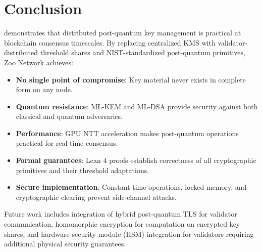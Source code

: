 \section{Conclusion}


\KChain{} demonstrates that distributed post-quantum key management is practical at blockchain consensus timescales. By replacing centralized KMS with validator-distributed threshold shares and NIST-standardized post-quantum primitives, Zoo Network achieves:

\begin{itemize}
\item \textbf{No single point of compromise}: Key material never exists in complete form on any node.
\item \textbf{Quantum resistance}: ML-KEM and ML-DSA provide security against both classical and quantum adversaries.
\item \textbf{Performance}: GPU NTT acceleration makes post-quantum operations practical for real-time consensus.
\item \textbf{Formal guarantees}: Lean 4 proofs establish correctness of all cryptographic primitives and their threshold adaptations.
\item \textbf{Secure implementation}: Constant-time operations, locked memory, and cryptographic clearing prevent side-channel attacks.
\end{itemize}

Future work includes integration of hybrid post-quantum TLS for validator communication, homomorphic encryption for computation on encrypted key shares, and hardware security module (HSM) integration for validators requiring additional physical security guarantees.

